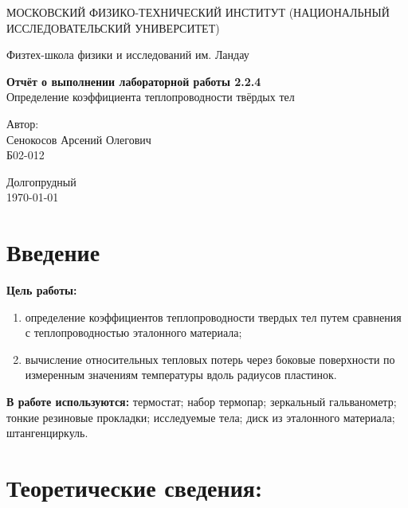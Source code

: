 \documentclass[a4paper,12pt]{article} %
\date{\today}
\begin{document}
\begin{titlepage}
	\begin{center}
		{\large МОСКОВСКИЙ ФИЗИКО-ТЕХНИЧЕСКИЙ ИНСТИТУТ (НАЦИОНАЛЬНЫЙ ИССЛЕДОВАТЕЛЬСКИЙ УНИВЕРСИТЕТ)}
	\end{center}
	\begin{center}
		{\large Физтех-школа физики и исследований им. Ландау}
	\end{center}
	
	
	\vspace{4.5cm}
	{\huge
		\begin{center}
			{\bf Отчёт о выполнении лабораторной работы 2.2.4}\\
			Определение коэффициента теплопроводности твёрдых тел
		\end{center}
	}
	\vspace{2cm}
	\begin{flushright}
		{\LARGE Автор:\\ Сенокосов Арсений Олегович \\
			\vspace{0.2cm}
			Б02-012}
	\end{flushright}
	\vspace{8cm}
	\begin{center}
		Долгопрудный\\
		\today
	\end{center}
\end{titlepage}


\section{Введение}
\textbf{Цель работы:}  \begin{enumerate}
	\item определение коэффициентов теплопроводности твердых тел путем сравнения с теплопроводностью эталонного материала;
	\item вычисление относительных тепловых потерь через боковые поверхности по измеренным значениям температуры вдоль радиусов пластинок.
\end{enumerate}

\textbf{В работе используются:} термостат; набор термопар; зеркальный гальванометр; тонкие резиновые прокладки; исследуемые тела; диск из эталонного материала; штангенциркуль.

\section{Теоретические сведения:}
\end{document}
